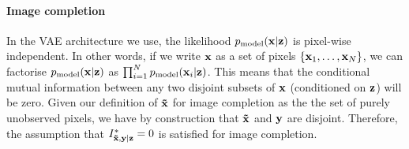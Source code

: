 \paragraph{Image completion}
In the VAE architecture we use, the likelihood $p_{\rm{model}}{}(\mathbf{x}{}|\mathbf{z}{})$ is pixel-wise
independent. In other words, if we write $\mathbf{x}{}$ as a set of pixels
$\{\mathbf{x}{}_1,\ldots,\mathbf{x}{}_N\}$, we can factorise $p_{\rm{model}}{}(\mathbf{x}{}|\mathbf{z}{})$ as
$\prod_{i=1}^Np_{\rm{model}}{}(\mathbf{x}{}_i|\mathbf{z}{})$. This means that the conditional mutual
information between any two disjoint subsets of $\mathbf{x}{}$ (conditioned on $\mathbf{z}{}$) will
be zero. Given our definition of $\mathbf{\tilde{x}}{}$ for image completion as the the set
of purely unobserved pixels, we have by construction that $\mathbf{\tilde{x}}{}$ and
$\mathbf{y}{}$ are disjoint. Therefore, the assumption that $I^*_{\mathbf{\tilde{x}}{},\mathbf{y}{}|\mathbf{z}{}}{}=0$ is
satisfied for image completion.


